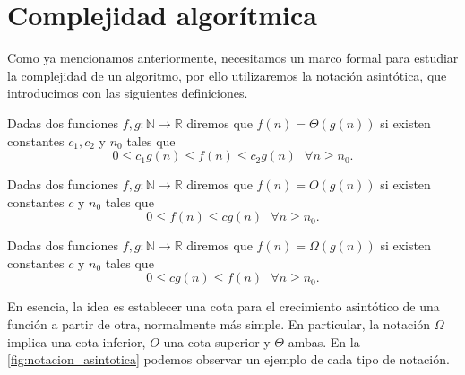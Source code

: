 
\chapter{Complejidad algorítmica}\label{ch:cuarto-capitulo}


Como ya mencionamos anteriormente, necesitamos un marco formal para estudiar la complejidad de un algoritmo, por ello utilizaremos la notación asintótica, que introducimos con las siguientes definiciones.

\begin{definicion}
	Dadas dos funciones $f,g:\mathbb{N}\rightarrow \mathbb{R}$ diremos que $f(n)=\Theta(g(n))$ si existen constantes $c_1,c_2$ y $n_0$ tales que $$0\leq c_1g(n)\leq f(n)\leq c_2g(n)\ \ \ \forall n\geq n_0.$$
\end{definicion}

\begin{definicion}
	Dadas dos funciones $f,g:\mathbb{N}\rightarrow \mathbb{R}$ diremos que $f(n)=O(g(n))$ si existen constantes $c$ y $n_0$ tales que $$0\leq f(n)\leq cg(n)\ \ \ \forall n\geq n_0.$$
\end{definicion}

\begin{definicion}
	Dadas dos funciones $f,g:\mathbb{N}\rightarrow \mathbb{R}$ diremos que $f(n)=\Omega(g(n))$ si existen constantes $c$ y $n_0$ tales que $$0\leq cg(n)\leq f(n)\ \ \ \forall n\geq n_0.$$
\end{definicion}

En esencia, la idea es establecer una cota para el crecimiento asintótico de una función a partir de otra, normalmente más simple. En particular, la notación $\Omega$ implica una cota inferior, $O$ una cota superior y $\Theta$ ambas. En la \autoref{fig:notacion_asintotica} podemos observar un ejemplo de cada tipo de notación. \\

